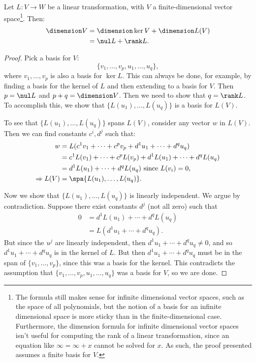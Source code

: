 \begin{theorem}\label{dimension_formula}
Let $L \colon V\rightarrow W$ be a linear transformation, with $V$ a finite-dimensional vector space\footnote{The formula still makes sense for infinite dimensional vector spaces, such as the space of all polynomials, but the notion of a basis for an infinite dimensional space is more sticky than in the finite-dimensional case.  Furthermore, the dimension formula for infinite dimensional vector spaces isn't useful for computing the rank of a linear transformation, since an equation like $\infty=\infty+x$ cannot be solved for $x$. As such, the proof presented assumes a finite basis for $V$.}.  Then:
\begin{align*}
\dimension V &= \dimension \ker V + \dimension L(V)\\
 &= \nul L + \rank L.
\end{align*}
\end{theorem}



\begin{proof}
Pick a basis for $V$:
\[
\{ v_1,\ldots,v_p,u_1,\ldots, u_q \},
\]
where $v_1,\ldots,v_p$ is also a basis for $\ker L$.  This can always be done, for example, by finding a basis for the kernel of $L$ and then extending to a basis for $V$.  Then $p=\nul L$ and $p+q=\dimension V$.  Then we need to show that $q=\rank L$.  To accomplish this, we show that 
$\{L(u_1),\ldots,L(u_q)\}$ is a basis for $L(V)$.

To see that $\{L(u_1),\ldots,L(u_q)\}$ spans $L(V)$, consider any vector $w$ in $L(V)$.  Then we can find constants $c^i, d^j$ such that:
\begin{align*}
w &= L(c^1v_1 + \cdots + c^pv_p+d^1u_1 + \cdots + d^qu_q)\\
  &= c^1L(v_1) + \cdots + c^pL(v_p)+d^1L(u_1)+\cdots+d^qL(u_q)\\
  &= d^1L(u_1)+\cdots+d^qL(u_q) \text{ since $L(v_i)=0$,}\\
\Rightarrow L(V) &= \spa \{L(u_1), \ldots, L(u_q)  \}.
\end{align*}

Now we show that $\{L(u_1),\ldots,L(u_q)\}$ is linearly independent.  We argue by contradiction. Suppose there exist constants $d^j$ (not all zero) such that
\begin{align*}
0 &= d^1L(u_1)+\cdots+d^qL(u_q)\\
  &= L(d^1u_1+\cdots+d^qu_q).
\end{align*}
But since the $u^j$ are linearly independent, then $d^1u_1+\cdots+d^qu_q\neq 0$, and so $d^1u_1+\cdots+d^qu_q$ is in the kernel of $L$.  But then $d^1u_1+\cdots+d^qu_q$ must be in the span of $\{v_1,\ldots, v_p\}$, since this was a basis for the kernel.  This contradicts the assumption that $\{ v_1,\ldots,v_p,u_1,\ldots, u_q \}$ was a basis for $V$, so we are done.
\end{proof}

